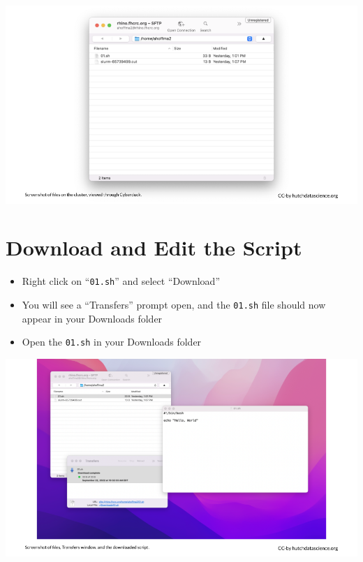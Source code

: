 \documentclass[
]{book}
\providecommand{\tightlist}{%
  \setlength{\itemsep}{0pt}\setlength{\parskip}{0pt}}
\begin{document}
\includegraphics[width=1\linewidth]{resources/images/08-upload-download_files/figure-latex//1BQxrVYdKZTbpCaF-i_q9w7s9x034lEXpQZDU-Sl09cs_g1579ffd7b01_12_37}

\hypertarget{download-and-edit-the-script}{%
\section{Download and Edit the Script}\label{download-and-edit-the-script}}

\begin{itemize}
\tightlist
\item
  Right click on ``\texttt{01.sh}'' and select ``Download''
\item
  You will see a ``Transfers'' prompt open, and the \texttt{01.sh} file should now appear in your Downloads folder
\item
  Open the \texttt{01.sh} in your Downloads folder
\end{itemize}

\includegraphics[width=1\linewidth]{resources/images/08-upload-download_files/figure-latex//1BQxrVYdKZTbpCaF-i_q9w7s9x034lEXpQZDU-Sl09cs_g1579ffd7b01_12_41}
\end{document}
